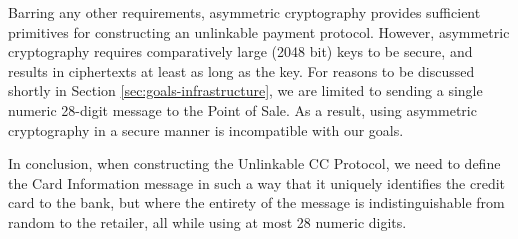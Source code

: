 Barring any other requirements, asymmetric cryptography provides sufficient primitives for constructing an unlinkable payment protocol.
However, asymmetric cryptography requires comparatively large (2048 bit) keys to be secure, and results in ciphertexts at least as long as the key.
For reasons to be discussed shortly in Section \ref{sec:goals-infrastructure}, we are limited to sending a single numeric 28-digit message to the Point of Sale.
As a result, using asymmetric cryptography in a secure manner is incompatible with our goals.

In conclusion, when constructing the Unlinkable CC Protocol, we need to define the Card Information message in such a way that it uniquely identifies the credit card to the bank,
  but where the entirety of the message is indistinguishable from random to the retailer,
  all while using at most 28 numeric digits.

